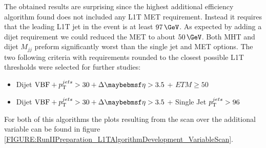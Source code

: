 The obtained results are surprising since the highest additional efficiency algorithm found does not included any \gls{L1T} \gls{MET} requirement. Instead it requires that the leading \gls{L1T} jet in the event is at least $97\,\GeV$. As expected by adding a dijet requirement we could reduced the \gls{MET} to about $50\,\GeV$. Both \gls{MHT} and dijet $M_{jj}$ preform significantly worst than the single jet and \gls{MET} options. The two following criteria with requirements rounded to the closest possible \gls{L1T} thresholds were selected for further studies:

\begin{itemize}
  \item Dijet $\text{VBF} + \pt^{jets}>30 + \Delta\eta>3.5$ + $ETM \geq 50$
  \item Dijet $\text{VBF} + \pt^{jets}>30 + \Delta\eta>3.5$ + Single Jet $p_{\mathrm{T}}^{jets}>96$ 
\end{itemize}

For both of this algorithms the plots resulting from the scan over the additional variable can be found in figure \ref{FIGURE:RunIIPreparation_L1TAlgorithmDevelopment_VariableScan}. 

